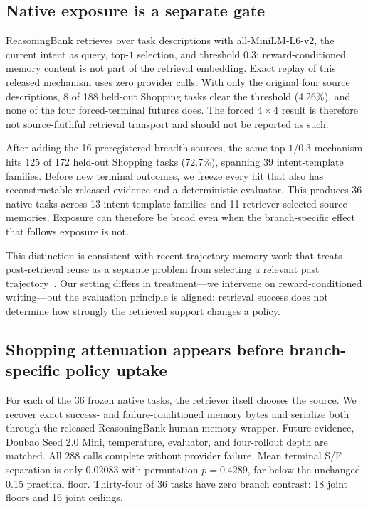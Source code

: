 \subsection{Native exposure is a separate gate}
ReasoningBank retrieves over task descriptions with all-MiniLM-L6-v2, the current intent as query, top-$1$ selection, and threshold 0.3; reward-conditioned memory content is not part of the retrieval embedding. Exact replay of this released mechanism uses zero provider calls. With only the original four source descriptions, 8 of 188 held-out Shopping tasks clear the threshold (4.26\%), and none of the four forced-terminal futures does. The forced $4\times4$ result is therefore not source-faithful retrieval transport and should not be reported as such.

After adding the 16 preregistered breadth sources, the same top-$1$/0.3 mechanism hits 125 of 172 held-out Shopping tasks (72.7\%), spanning 39 intent-template families. Before new terminal outcomes, we freeze every hit that also has reconstructable released evidence and a deterministic evaluator. This produces 36 native tasks across 13 intent-template families and 11 retriever-selected source memories. Exposure can therefore be broad even when the branch-specific effect that follows exposure is not.

This distinction is consistent with recent trajectory-memory work that treats post-retrieval reuse as a separate problem from selecting a relevant past trajectory~\citep{li2026beyondretrieval}. Our setting differs in treatment---we intervene on reward-conditioned writing---but the evaluation principle is aligned: retrieval success does not determine how strongly the retrieved support changes a policy.

\subsection{Shopping attenuation appears before branch-specific policy uptake}
For each of the 36 frozen native tasks, the retriever itself chooses the source. We recover exact success- and failure-conditioned memory bytes and serialize both through the released ReasoningBank human-memory wrapper. Future evidence, Doubao Seed 2.0 Mini, temperature, evaluator, and four-rollout depth are matched. All 288 calls complete without provider failure. Mean terminal S/F separation is only 0.02083 with permutation $p=0.4289$, far below the unchanged 0.15 practical floor. Thirty-four of 36 tasks have zero branch contrast: 18 joint floors and 16 joint ceilings.

